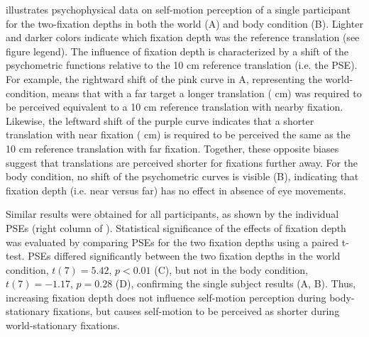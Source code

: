  illustrates psychophysical data on self-motion perception of a single participant for the two-fixation depths in both the world (A) and body condition (B). Lighter and darker colors indicate which fixation depth was the reference translation (see figure legend). The influence of fixation depth is characterized by a shift of the psychometric functions relative to the 10 \si{\centi\metre} reference translation (i.e. the PSE). For example, the rightward shift of the pink curve in A, representing the world-condition, means that with a far target a longer translation ( \si{\centi\metre}) was required to be perceived equivalent to a 10 \si{\centi\metre} reference translation with nearby fixation. Likewise, the leftward shift of the purple curve indicates that a shorter translation with near fixation ( \si{\centi\metre}) is required to be perceived the same as the 10 \si{\centi\metre} reference translation with far fixation. Together, these opposite biases suggest that translations are perceived shorter for fixations further away. For the body condition, no shift of the psychometric curves is visible (B), indicating that fixation depth (i.e. near versus far) has no effect in absence of eye movements.

Similar results were obtained for all participants, as shown by the individual PSEs (right column of ). Statistical significance of the effects of fixation depth was evaluated by comparing PSEs for the two fixation depths using a paired t-test. PSEs  differed significantly between the two fixation depths in the world condition, $t(7) = 5.42$, $p < 0.01$ (C), but not in the body condition, $t(7) = -1.17$, $p = 0.28$ (D), confirming the single subject results (A, B). Thus, increasing fixation depth does not influence self-motion perception during body-stationary fixations, but causes self-motion to be perceived as shorter during world-stationary fixations.


